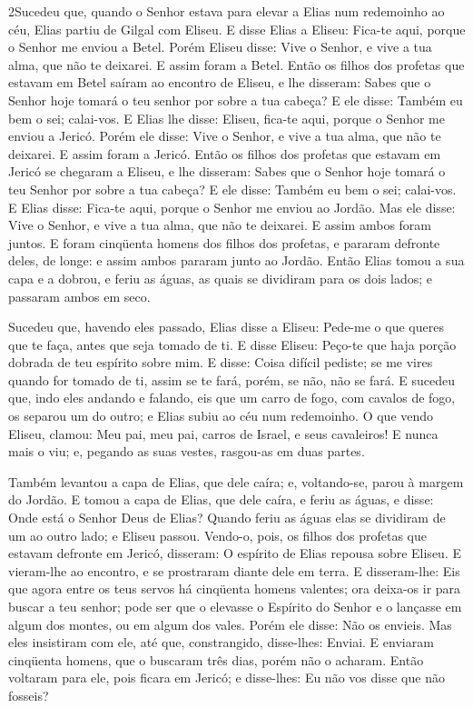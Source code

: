 \medskip

\lettrine{2} Sucedeu que, quando o Senhor estava para elevar a
Elias num redemoinho ao céu, Elias partiu de Gilgal com Eliseu.
E disse Elias a Eliseu: Fica-te aqui, porque o Senhor me enviou
a Betel. Porém Eliseu disse: Vive o Senhor, e vive a tua alma, que
não te deixarei. E assim foram a Betel. Então os filhos dos
profetas que estavam em Betel saíram ao encontro de Eliseu, e lhe
disseram: Sabes que o Senhor hoje tomará o teu senhor por sobre a
tua cabeça? E ele disse: Também eu bem o sei; calai-vos. E Elias
lhe disse: Eliseu, fica-te aqui, porque o Senhor me enviou a Jericó.
Porém ele disse: Vive o Senhor, e vive a tua alma, que não te
deixarei. E assim foram a Jericó. Então os filhos dos profetas
que estavam em Jericó se chegaram a Eliseu, e lhe disseram: Sabes
que o Senhor hoje tomará o teu Senhor por sobre a tua cabeça? E ele
disse: Também eu bem o sei; calai-vos. E Elias disse: Fica-te
aqui, porque o Senhor me enviou ao Jordão. Mas ele disse: Vive o
Senhor, e vive a tua alma, que não te deixarei. E assim ambos foram
juntos. E foram cinqüenta homens dos filhos dos profetas, e
pararam defronte deles, de longe: e assim ambos pararam junto ao
Jordão. Então Elias tomou a sua capa e a dobrou, e feriu as
águas, as quais se dividiram para os dois lados; e passaram ambos em
seco.

Sucedeu que, havendo eles passado, Elias disse a Eliseu: Pede-me o
que queres que te faça, antes que seja tomado de ti. E disse Eliseu:
Peço-te que haja porção dobrada de teu espírito sobre mim. E
disse: Coisa difícil pediste; se me vires quando for tomado de ti,
assim se te fará, porém, se não, não se fará. E sucedeu que,
indo eles andando e falando, eis que um carro de fogo, com cavalos
de fogo, os separou um do outro; e Elias subiu ao céu num
redemoinho. O que vendo Eliseu, clamou: Meu pai, meu pai,
carros de Israel, e seus cavaleiros! E nunca mais o viu; e, pegando
as suas vestes, rasgou-as em duas partes.

Também levantou a capa de Elias, que dele caíra; e, voltando-se,
parou à margem do Jordão. E tomou a capa de Elias, que dele
caíra, e feriu as águas, e disse: Onde está o Senhor Deus de Elias?
Quando feriu as águas elas se dividiram de um ao outro lado; e
Eliseu passou. Vendo-o, pois, os filhos dos profetas que
estavam defronte em Jericó, disseram: O espírito de Elias repousa
sobre Eliseu. E vieram-lhe ao encontro, e se prostraram diante dele
em terra. E disseram-lhe: Eis que agora entre os teus servos
há cinqüenta homens valentes; ora deixa-os ir para buscar a teu
senhor; pode ser que o elevasse o Espírito do Senhor e o lançasse em
algum dos montes, ou em algum dos vales. Porém ele disse: Não os
envieis. Mas eles insistiram com ele, até que, constrangido,
disse-lhes: Enviai. E enviaram cinqüenta homens, que o buscaram três
dias, porém não o acharam. Então voltaram para ele, pois
ficara em Jericó; e disse-lhes: Eu não vos disse que não fosseis?

